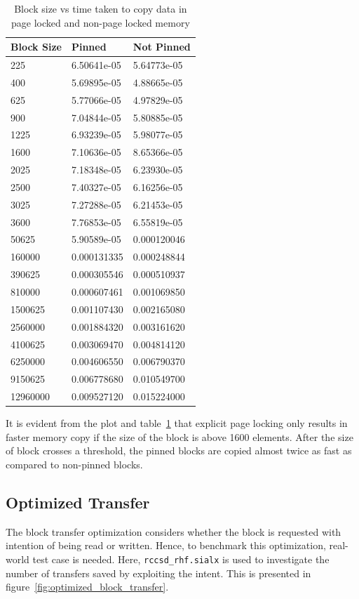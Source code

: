 \begin{table}[h]
  \centering
  \caption{Block size vs time taken to copy data in page locked and non-page locked memory}
  \begin{tabular}{l l l}
    \hline
    Block Size & Pinned      & Not Pinned  \\
    \hline
    225        & 6.50641e-05 & 5.64773e-05 \\
    400        & 5.69895e-05 & 4.88665e-05 \\
    625        & 5.77066e-05 & 4.97829e-05 \\
    900        & 7.04844e-05 & 5.80885e-05 \\
    1225       & 6.93239e-05 & 5.98077e-05 \\
    1600       & 7.10636e-05 & 8.65366e-05 \\
    2025       & 7.18348e-05 & 6.23930e-05 \\
    2500       & 7.40327e-05 & 6.16256e-05 \\
    3025       & 7.27288e-05 & 6.21453e-05 \\
    3600       & 7.76853e-05 & 6.55819e-05 \\
    50625      & 5.90589e-05 & 0.000120046 \\
    160000     & 0.000131335 & 0.000248844 \\
    390625     & 0.000305546 & 0.000510937 \\
    810000     & 0.000607461 & 0.001069850 \\
    1500625    & 0.001107430 & 0.002165080 \\
    2560000    & 0.001884320 & 0.003161620 \\
    4100625    & 0.003069470 & 0.004814120 \\
    6250000    & 0.004606550 & 0.006790370 \\
    9150625    & 0.006778680 & 0.010549700 \\
    12960000   & 0.009527120 & 0.015224000 \\
    \hline
  \end{tabular}
  \label{tab:mempin_block_copy}
\end{table}

It is evident from the plot and table~\ref{tab:mempin_block_copy} that explicit
page locking only results in faster memory copy if the size of the block is above
1600 elements. After the size of block crosses a threshold, the pinned blocks are
copied almost twice as fast as compared to non-pinned blocks.

\subsection{Optimized Transfer}
The block transfer optimization considers whether the block is requested with
intention of being read or written. Hence, to benchmark this optimization, real-world
test case is needed. Here, \texttt{rccsd\_rhf.sialx} is used to investigate the
number of transfers saved by exploiting the intent. This is presented in
figure~\ref{fig:optimized_block_transfer}.

